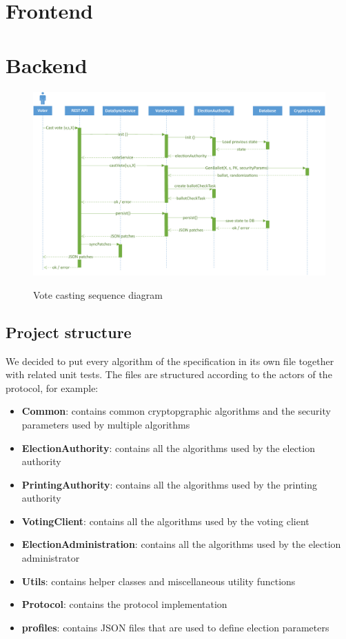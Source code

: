 \section{Frontend}
\section{Backend}
\begin{figure}[h!]
\begin{center}
\includegraphics[scale=0.65]{assets/votecastingDiagram.pdf}\\
\caption{Vote casting sequence diagram}
\end{center}
\end{figure}

\subsection{Project structure}
We decided to put every algorithm of the specification in its own file together with related unit tests. The files are structured according to the actors of the protocol, for example:

\begin{itemize}
	\item \textbf{Common}: contains common cryptopgraphic algorithms and the security parameters used by multiple algorithms
	\item \textbf{ElectionAuthority}: contains all the algorithms used by the election authority
	\item \textbf{PrintingAuthority}: contains all the algorithms used by the printing authority
	\item \textbf{VotingClient}: contains all the algorithms used by the voting client
	\item \textbf{ElectionAdministration}: contains all the algorithms used by the election administrator
	\item \textbf{Utils}: contains helper classes and miscellaneous utility functions
	\item \textbf{Protocol}: contains the protocol implementation
	\item \textbf{profiles}: contains JSON files that are used to define election parameters
\end{itemize}

